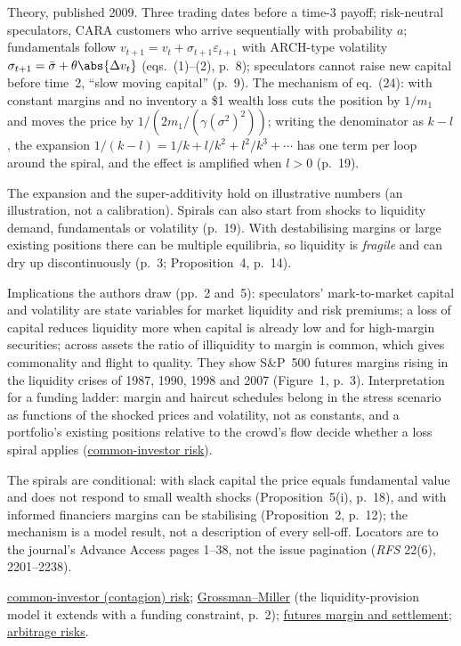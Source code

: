\begin{qfmodel}
 Theory, published 2009. Three trading dates before a time-3 payoff; risk-neutral speculators, CARA customers who arrive sequentially with probability $a$; fundamentals follow $v_{t+1}=v_t+\sigma_{t+1}\varepsilon_{t+1}$ with ARCH-type volatility $\sigma_{t+1}=\bar\sigma+\theta\abs{\Delta v_t}$ (eqs.~(1)--(2), p.~8); speculators cannot raise new capital before time~2, ``slow moving capital'' (p.~9). The mechanism of eq.~(24): with constant margins and no inventory a \$1 wealth loss cuts the position by $1/m_1$ and moves the price by $1/(2m_1/(\gamma(\sigma^2)^2))$; writing the denominator as $k-l$, the expansion $1/(k-l)=1/k+l/k^2+l^2/k^3+\cdots$ has one term per loop around the spiral, and the effect is amplified when $l>0$ (p.~19).

The expansion and the super-additivity hold on illustrative numbers (an illustration, not a calibration). Spirals can also start from shocks to liquidity demand, fundamentals or volatility (p.~19). With destabilising margins or large existing positions there can be multiple equilibria, so liquidity is \emph{fragile} and can dry up discontinuously (p.~3; Proposition~4, p.~14).

 Implications the authors draw (pp.~2 and~5): speculators' mark-to-market capital and volatility are state variables for market liquidity and risk premiums; a loss of capital reduces liquidity more when capital is already low and for high-margin securities; across assets the ratio of illiquidity to margin is common, which gives commonality and flight to quality. They show S\&P~500 futures margins rising in the liquidity crises of 1987, 1990, 1998 and 2007 (Figure~1, p.~3). Interpretation for a funding ladder: margin and haircut schedules belong in the stress scenario as functions of the shocked prices and volatility, not as constants, and a portfolio's existing positions relative to the crowd's flow decide whether a loss spiral applies (\hyperref[def:common-investor-contagion]{common-investor risk}).

 The spirals are conditional: with slack capital the price equals fundamental value and does not respond to small wealth shocks (Proposition~5(i), p.~18), and with informed financiers margins can be stabilising (Proposition~2, p.~12); the mechanism is a model result, not a description of every sell-off. Locators are to the journal's Advance Access pages 1--38, not the issue pagination (\emph{RFS} 22(6), 2201--2238).

 \hyperref[def:common-investor-contagion]{common-investor (contagion) risk}; \hyperref[mod:grossman-miller]{Grossman--Miller} (the liquidity-provision model it extends with a funding constraint, p.~2); \hyperref[mech:futures-margin-settlement]{futures margin and settlement}; \hyperref[res:arbitrage-risks]{arbitrage risks}.


\end{qfmodel}

